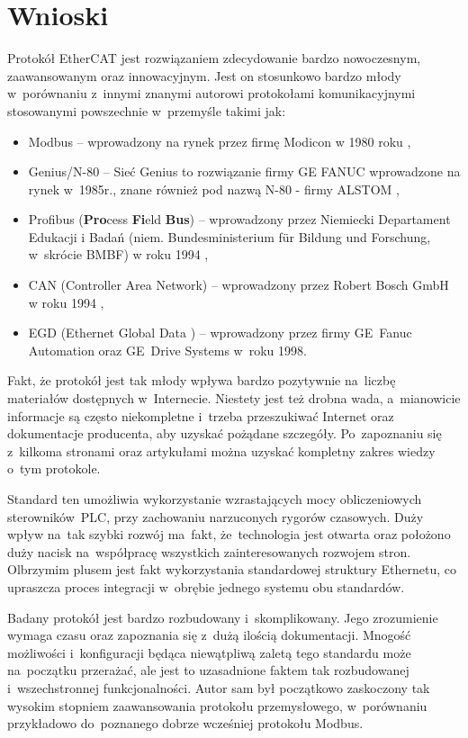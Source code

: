 \section{Wnioski}
Protokół EtherCAT jest rozwiązaniem zdecydowanie bardzo nowoczesnym, zaawansowanym oraz innowacyjnym. 
Jest on stosunkowo bardzo młody w~porównaniu z~innymi znanymi autorowi protokołami komunikacyjnymi stosowanymi powszechnie w~przemyśle takimi jak:
\begin{itemize}
\item Modbus -- wprowadzony na rynek przez firmę Modicon w 1980 roku \cite{kwiecien},
\item Genius/N-80 -- Sieć Genius to rozwiązanie firmy GE FANUC wprowadzone na rynek w~1985r., znane również pod nazwą N-80 - firmy ALSTOM \cite{kwiecien},
\item Profibus (\textbf{Pro}cess \textbf{Fi}eld \textbf{Bus}) -- wprowadzony przez Niemiecki Departament Edukacji i Badań (niem. Bundesministerium für Bildung und Forschung, w~skrócie BMBF) w roku 1994 \cite{kwiecien},
\item CAN (Controller Area Network) -- wprowadzony przez Robert Bosch GmbH w roku 1994 \cite{kwiecien},
\item EGD (Ethernet Global Data ) -- wprowadzony przez firmy GE~Fanuc Automation oraz GE~Drive Systems w~roku 1998.
\end{itemize}

Fakt, że protokół jest tak młody wpływa bardzo pozytywnie na~liczbę materiałów dostępnych w~Internecie. Niestety jest też drobna wada, a~mianowicie informacje są często niekompletne i~trzeba przeszukiwać Internet oraz dokumentacje producenta, aby uzyskać pożądane szczegóły. Po~zapoznaniu się z~kilkoma stronami oraz artykułami można uzyskać kompletny zakres wiedzy o~tym protokole.

Standard ten umożliwia wykorzystanie wzrastających mocy obliczeniowych sterowników~PLC, przy zachowaniu narzuconych rygorów czasowych. Duży wpływ na~tak szybki rozwój ma~fakt, że~technologia jest otwarta oraz położono duży nacisk na~współpracę wszystkich zainteresowanych rozwojem stron. Olbrzymim plusem jest fakt wykorzystania standardowej struktury Ethernetu, co upraszcza proces integracji w~obrębie jednego systemu obu standardów.

Badany protokół jest bardzo rozbudowany i~skomplikowany. Jego zrozumienie wymaga czasu oraz zapoznania się z~dużą ilością dokumentacji. Mnogość możliwości i~konfiguracji będąca niewątpliwą zaletą tego standardu może na~początku przerażać, ale jest to uzasadnione faktem tak rozbudowanej i~wszechstronnej funkcjonalności. Autor sam był początkowo zaskoczony tak wysokim stopniem zaawansowania protokołu przemysłowego, w~porównaniu przykładowo do~poznanego dobrze wcześniej protokołu Modbus.

